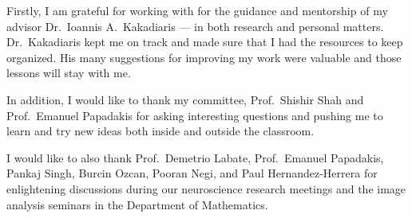 \begin{acknowledgements}
	Firstly, I am grateful for working with for the guidance and mentorship
	of my advisor Dr.~Ioannis A.\ Kakadiaris --- in both research and personal
	matters. Dr.~Kakadiaris kept me on track and made sure that I had the
	resources to keep organized. His many suggestions for improving my
	work were valuable and those lessons will stay with me.

	In addition, I would like to thank my committee, Prof.~Shishir Shah and
	Prof.~Emanuel Papadakis for asking interesting questions and pushing me to
	learn and try new ideas both inside and outside the classroom.

	I would like to also thank Prof.~Demetrio Labate, Prof.~Emanuel Papadakis,
	Pankaj Singh, Burcin Ozcan, Pooran Negi, and Paul Hernandez-Herrera for
	enlightening discussions during our neuroscience research meetings and
	the image analysis seminars in the Department of Mathematics.


\end{acknowledgements}
